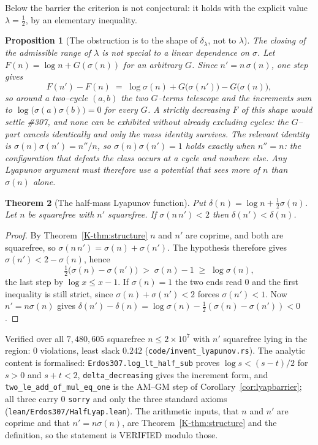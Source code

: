 \documentclass[11pt]{article}
\newtheorem{theorem}{Theorem}[section]
\newtheorem{proposition}[theorem]{Proposition}
\theoremstyle{definition}
\begin{document}
Below the barrier the criterion is not conjectural: it holds with the explicit value
$\lambda=\tfrac12$, by an elementary inequality.

\begin{proposition}[The obstruction is to the shape of $\delta_\lambda$, not to $\lambda$]\label{prop:lyapshape}
The closing of the admissible range of $\lambda$ is not special to a linear dependence on $\sigma$.
Let $F(n)=\log n+G(\sigma(n))$ for an arbitrary $G$. Since $n'=n\,\sigma(n)$, one step gives
\[ F(n')-F(n)\;=\;\log\sigma(n)+G\bigl(\sigma(n')\bigr)-G\bigl(\sigma(n)\bigr), \]
so around a two--cycle $(a,b)$ the two $G$--terms telescope and the increments sum to
$\log\bigl(\sigma(a)\sigma(b)\bigr)=0$ for \emph{every} $G$. A strictly decreasing $F$ of this shape
would settle \#307, and none can be exhibited without already excluding cycles: the $G$--part
cancels identically and only the mass identity survives. The relevant identity is
$\sigma(n)\sigma(n')=n''/n$, so $\sigma(n)\sigma(n')=1$ holds exactly when $n''=n$: the configuration
that defeats the class occurs at a cycle and nowhere else. Any Lyapunov argument must therefore use a
potential that sees more of $n$ than $\sigma(n)$ alone.
\end{proposition}

\begin{theorem}[The half-mass Lyapunov function]\label{thm:halflyap}
Put $\delta(n)=\log n+\tfrac12\sigma(n)$. Let $n$ be squarefree with $n'$ squarefree. If
$\sigma(n\,n')<2$ then $\delta(n')<\delta(n)$.
\end{theorem}
\begin{proof}
By Theorem~\ref{K-thm:structure} $n$ and $n'$ are coprime, and both are squarefree, so
$\sigma(n\,n')=\sigma(n)+\sigma(n')$. The hypothesis therefore gives $\sigma(n')<2-\sigma(n)$, hence
\[ \tfrac12\bigl(\sigma(n)-\sigma(n')\bigr)\;>\;\sigma(n)-1\;\ge\;\log\sigma(n), \]
the last step by $\log x\le x-1$. If $\sigma(n)=1$ the two ends read $0$ and the first inequality is
still strict, since $\sigma(n)+\sigma(n')<2$ forces $\sigma(n')<1$. Now $n'=n\sigma(n)$ gives
$\delta(n')-\delta(n)=\log\sigma(n)-\tfrac12(\sigma(n)-\sigma(n'))<0$.
\end{proof}
Verified over all $7{,}480{,}605$ squarefree $n\le2\times10^7$ with $n'$ squarefree lying in the
region: $0$ violations, least slack $0.242$ \textup{(\texttt{code/invent\_lyapunov.rs})}. The analytic content is formalised:
\texttt{Erdos307.log\_lt\_half\_sub} proves $\log s<(s-t)/2$ for $s>0$ and $s+t<2$,
\texttt{delta\_decreasing} gives the increment form, and
\texttt{two\_le\_add\_of\_mul\_eq\_one} is the \textup{AM--GM} step of
Corollary~\ref{cor:lyapbarrier}; all three carry $0$ \texttt{sorry} and only the three standard
axioms \textup{(\texttt{lean/Erdos307/HalfLyap.lean})}. The arithmetic inputs, that $n$ and $n'$ are
coprime and that $n'=n\sigma(n)$, are Theorem~\ref{K-thm:structure} and the definition, so the
statement is \textup{VERIFIED} modulo those.
\end{document}
